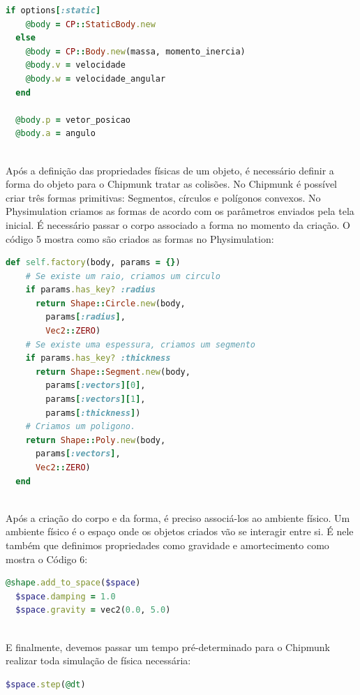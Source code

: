 \begin{lstlisting}[language=Ruby, caption=physics.rb]
  if options[:static]
    @body = CP::StaticBody.new
  else
    @body = CP::Body.new(massa, momento_inercia)
    @body.v = velocidade
    @body.w = velocidade_angular
  end

  @body.p = vetor_posicao
  @body.a = angulo
\end{lstlisting} 

\ \\
Após a definição das propriedades físicas de um objeto, é necessário definir a forma do objeto para o Chipmunk tratar as colisões. No Chipmunk é 
possível criar três formas primitivas: Segmentos, círculos e polígonos convexos. No Physimulation criamos as formas de acordo com os parâmetros enviados
pela tela inicial. É necessário passar o corpo associado a forma no momento da criação. O código 5 mostra como são criados as formas no Physimulation:

\begin{lstlisting}[language=Ruby, caption=physics.rb]
  def self.factory(body, params = {})
    # Se existe um raio, criamos um circulo
    if params.has_key? :radius
      return Shape::Circle.new(body, 
        params[:radius], 
        Vec2::ZERO)
    # Se existe uma espessura, criamos um segmento
    if params.has_key? :thickness
      return Shape::Segment.new(body, 
        params[:vectors][0], 
        params[:vectors][1], 
        params[:thickness])
    # Criamos um poligono.
    return Shape::Poly.new(body, 
      params[:vectors], 
      Vec2::ZERO)
  end
\end{lstlisting} 

\ \\
Após a criação do corpo e da forma, é preciso associá-los ao ambiente físico. Um ambiente físico é o espaço onde os objetos criados vão se interagir entre si. É 
nele também que definimos propriedades como gravidade e amortecimento como mostra o Código 6:

\begin{lstlisting}[language=Ruby, caption=physics.rb]
  @shape.add_to_space($space)
  $space.damping = 1.0
  $space.gravity = vec2(0.0, 5.0)
\end{lstlisting}

\ \\
E finalmente, devemos passar um tempo pré-determinado para o Chipmunk realizar toda simulação de física necessária:

\begin{lstlisting}[language=Ruby, caption=physics.rb]
  $space.step(@dt)
\end{lstlisting}

